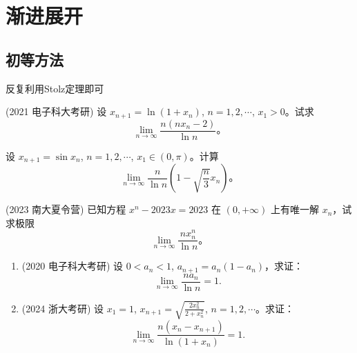 \documentclass[lang=cn,10pt,thmcnt=section]{elegantbook}
\begin{document}
\section{渐进展开}
\subsection{初等方法}
反复利用Stolz定理即可
\begin{example}
	(2021 电子科大考研) 设 $x_{n+1} = \ln(1+x_n)$, $n=1,2,\cdots$, $x_1>0$。试求 
\[
\lim_{n\to\infty}\frac{n(nx_n-2)}{\ln n}。
\]

\end{example}
\begin{example}
	设 $x_{n+1}=\sin x_n$, $n=1,2,\cdots$, $x_1\in (0,\pi)$。计算
\[
\lim_{n\to\infty}\frac{n}{\ln n}\left(1-\sqrt{\frac{n}{3}}x_n\right)。
\]
\end{example}
\begin{example}
	(2023 南大夏令营) 已知方程 $x^n - 2023x = 2023$ 在 $(0,+\infty)$ 上有唯一解 $x_n$，试求极限
\[
\lim_{n\to\infty}\frac{nx_n^n}{\ln n}。
\]
\end{example}
\begin{example}
	\begin{enumerate}
		\item (2020 电子科大考研) 设 $0 < a_n < 1$, $a_{n+1} = a_n (1 - a_n)$，求证：
		\[
		\lim_{n \to \infty} \frac{n a_n}{\ln n} = 1.
		\]
		
		\item (2024 浙大考研) 设 $x_1 = 1$, $x_{n+1} = \sqrt{\frac{2x_n^2}{2 + x_n^2}}$, $n = 1, 2, \cdots$。求证：
		\[
		\lim_{n \to \infty} \frac{n(x_n - x_{n+1})}{\ln (1 + x_n)} = 1.
		\]
	\end{enumerate}
\end{example}
\end{document}
